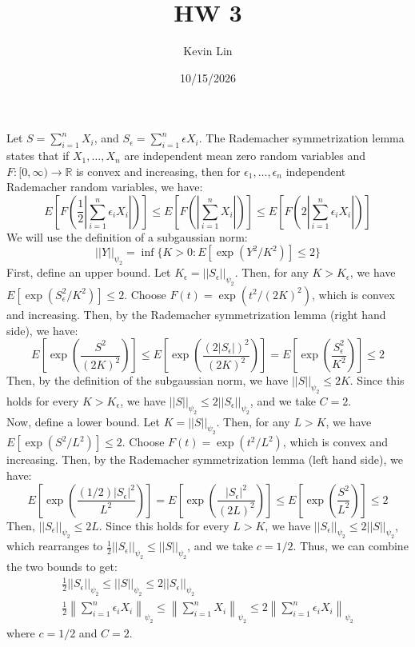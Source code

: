 \documentclass[11pt,a4paper,margin=1in]{article}
\title{HW 3}
\author{Kevin Lin}
\date{10/15/2026}
\begin{document}
\maketitle

\section{}
Let $S = \sum_{i=1}^n X_i$, and $S_\epsilon = \sum_{i=1}^n \epsilon X_i$. The
Rademacher symmetrization lemma states that if $X_1, \ldots, X_n$ are independent 
mean zero random variables and $F:[0,\infty)\to\mathbb R$ is convex and 
increasing, then for $\epsilon_1, \ldots, \epsilon_n$ independent Rademacher 
random variables, we have: 
\[
    E\left[F\left(\frac{1}{2}\left|\sum_{i=1}^n \epsilon_i X_i\right|\right)\right] \leq E\left[F\left(\left|\sum_{i=1}^n X_i\right|\right)\right] \leq E\left[F\left(2\left|\sum_{i=1}^n \epsilon_i X_i\right|\right)\right]
\]
We will use the definition of a subgaussian norm:
\[
    ||Y||_{\psi_2} = \inf\{K>0: E[\exp(Y^2/K^2)] \leq 2\}
\]
First, define an upper bound. Let $K_\epsilon = ||S_\epsilon||_{\psi_2}$. Then,
for any $K > K_\epsilon$, we have $E[\exp(S_\epsilon^2/K^2)] \leq 2$. Choose 
$F(t) = \exp(t^2/(2K)^2)$, which is convex and increasing. Then, by the Rademacher
symmetrization lemma (right hand side), we have:
\[
    E\left[\exp\left(\frac{S^2}{(2K)^2}\right)\right] \leq E\left[\exp\left(\frac{(2|S_\epsilon|)^2}{(2K)^2}\right)\right] = E\left[\exp\left(\frac{S_\epsilon^2}{K^2}\right)\right] \leq 2
\]
Then, by the definition of the subgaussian norm, we have $||S||_{\psi_2} \leq 2K$.
Since this holds for every $K > K_\epsilon$, we have $||S||_{\psi_2} \leq 2||S_\epsilon||_{\psi_2}$,
and we take $C = 2$. \\
\noindent
Now, define a lower bound. Let $K = ||S||_{\psi_2}$. Then, for any $L > K$, we 
have $E[\exp(S^2/L^2)] \leq 2$. Choose $F(t) = \exp(t^2/L^2)$, which is convex 
and increasing. Then, by the Rademacher symmetrization lemma (left hand side), we have:
\[
    E\left[\exp\left(\frac{(1/2)|S_\epsilon|^2}{L^2}\right)\right] = E\left[\exp\left(\frac{|S_\epsilon|^2}{(2L)^2}\right)\right] \leq E\left[\exp\left(\frac{S^2}{L^2}\right)\right] \leq 2
\]
Then, $||S_\epsilon||_{\psi_2} \leq 2L$. Since this holds for every $L > K$, we have
$||S_\epsilon||_{\psi_2} \leq 2||S||_{\psi_2}$, which rearranges to 
$\frac{1}{2}||S_\epsilon||_{\psi_2} \leq ||S||_{\psi_2}$, and we take $c = 1/2$.
Thus, we can combine the two bounds to get:
\begin{gather*}
    \frac{1}{2}||S_\epsilon||_{\psi_2} \leq ||S||_{\psi_2} \leq 2||S_\epsilon||_{\psi_2} \\
    \frac{1}{2}\left\|\sum_{i=1}^n \epsilon_i X_i\right\|_{\psi_2} \leq \left\|\sum_{i=1}^n X_i\right\|_{\psi_2} \leq 2\left\|\sum_{i=1}^n \epsilon_i X_i\right\|_{\psi_2}
\end{gather*}
where $c = 1/2$ and $C = 2$.
\end{document}
